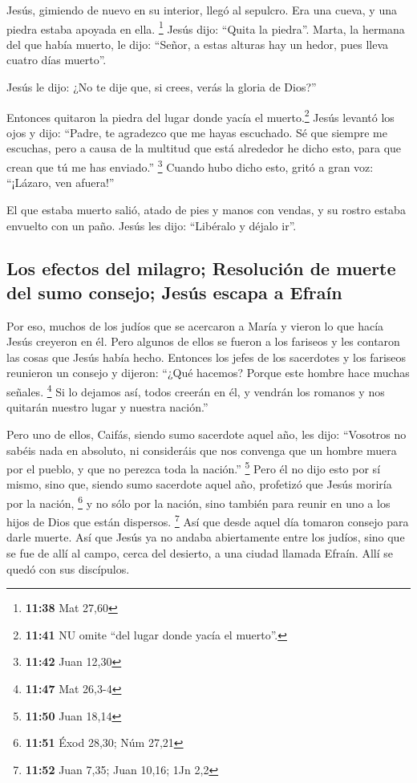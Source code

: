 \begin{paracol}{2}
 Jesús, gimiendo de nuevo en su interior, llegó al
sepulcro. Era una cueva, y una piedra estaba apoyada en ella.
\footnote{\textbf{11:38} Mat 27,60}  Jesús dijo: ``Quita
la piedra''. Marta, la hermana del que había muerto, le dijo: ``Señor, a
estas alturas hay un hedor, pues lleva cuatro días muerto''.

 Jesús le dijo: ¿No te dije que, si crees, verás la
gloria de Dios?''

 Entonces quitaron la piedra del lugar donde yacía el
muerto.\footnote{\textbf{11:41} NU omite ``del lugar donde yacía el
  muerto''.} Jesús levantó los ojos y dijo: ``Padre, te agradezco que me
hayas escuchado.  Sé que siempre me escuchas, pero a
causa de la multitud que está alrededor he dicho esto, para que crean
que tú me has enviado.'' \footnote{\textbf{11:42} Juan 12,30}
 Cuando hubo dicho esto, gritó a gran voz: ``¡Lázaro, ven
afuera!''

 El que estaba muerto salió, atado de pies y manos con
vendas, y su rostro estaba envuelto con un paño. Jesús les dijo:
``Libéralo y déjalo ir''.

\hypertarget{los-efectos-del-milagro-resoluciuxf3n-de-muerte-del-sumo-consejo-jesuxfas-escapa-a-efrauxedn}{%
\subsection{Los efectos del milagro; Resolución de muerte del sumo
consejo; Jesús escapa a
Efraín}\label{los-efectos-del-milagro-resoluciuxf3n-de-muerte-del-sumo-consejo-jesuxfas-escapa-a-efrauxedn}}

 Por eso, muchos de los judíos que se acercaron a María y
vieron lo que hacía Jesús creyeron en él.  Pero algunos
de ellos se fueron a los fariseos y les contaron las cosas que Jesús
había hecho.  Entonces los jefes de los sacerdotes y los
fariseos reunieron un consejo y dijeron: ``¿Qué hacemos? Porque este
hombre hace muchas señales. \footnote{\textbf{11:47} Mat 26,3-4}
 Si lo dejamos así, todos creerán en él, y vendrán los
romanos y nos quitarán nuestro lugar y nuestra nación.''

 Pero uno de ellos, Caifás, siendo sumo sacerdote aquel
año, les dijo: ``Vosotros no sabéis nada en absoluto,  ni
consideráis que nos convenga que un hombre muera por el pueblo, y que no
perezca toda la nación.'' \footnote{\textbf{11:50} Juan 18,14}
 Pero él no dijo esto por sí mismo, sino que, siendo sumo
sacerdote aquel año, profetizó que Jesús moriría por la nación,
\footnote{\textbf{11:51} Éxod 28,30; Núm 27,21}  y no
sólo por la nación, sino también para reunir en uno a los hijos de Dios
que están dispersos. \footnote{\textbf{11:52} Juan 7,35; Juan 10,16; 1Jn
  2,2}  Así que desde aquel día tomaron consejo para
darle muerte.  Así que Jesús ya no andaba abiertamente
entre los judíos, sino que se fue de allí al campo, cerca del desierto,
a una ciudad llamada Efraín. Allí se quedó con sus discípulos.


\end{paracol}

